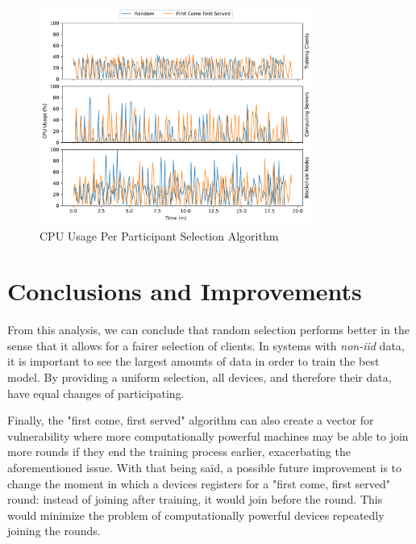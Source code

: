 \begin{figure}[!hpb]
    \centering
    \centering
    \includegraphics[width=0.8\textwidth]{graphics/selection/cpu.pdf}
    \caption{CPU Usage Per Participant Selection Algorithm}
    \label{fig:cpu_selection}
\end{figure}

\section{Conclusions and Improvements}

From this analysis, we can conclude that random selection performs better in the sense that it allows for a fairer selection of clients. In systems with \textit{non-iid} data, it is important to see the largest amounts of data in order to train the best model. By providing a uniform selection, all devices, and therefore their data, have equal changes of participating.

Finally, the "first come, first served" algorithm can also create a vector for vulnerability where more computationally powerful machines may be able to join more rounds if they end the training process earlier, exacerbating the aforementioned issue. With that being said, a possible future improvement is to change the moment in which a devices registers for a "first come, first served" round: instead of joining after training, it would join before the round. This would minimize the problem of computationally powerful devices repeatedly joining the rounds. %
